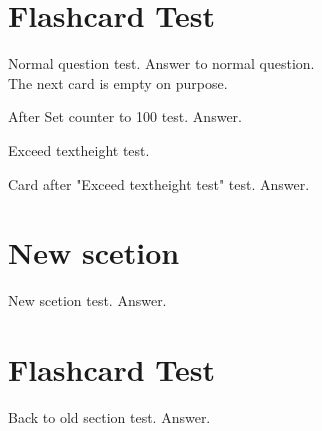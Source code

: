 \documentclass{../flashcard}
\begin{document}
\section{Flashcard Test}

\begin{card}{Normal question test.}
Answer to normal question.\\
The next card is empty on purpose.
\end{card}

\begin{card}{}

\end{card}

\setcounter{card}{100}
\begin{card}{After Set counter to 100 test.}
Answer.
\end{card}

\begin{card}{Exceed textheight test.}
\footnotesize
\blindtext[4]
\end{card}

\begin{card}{Card after "Exceed textheight test" test.}
Answer.
\end{card}

\section{New scetion}
\begin{card}{New scetion test.}
Answer.
\end{card}

\section{Flashcard Test}
\begin{card}{Back to old section test.}
Answer.
\end{card}

\listofcard

\printindex
\end{document}
